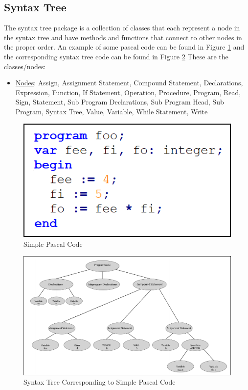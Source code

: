 \documentclass[english]{article}
\begin{document}
\subsection{Syntax Tree}

The syntax tree package is a collection of classes that each represent a node in the syntax tree and have methods and functions that connect to other nodes in the proper order. An example of some pascal code can be found in Figure \ref{Tree Code} and the corresponding syntax tree code can be found in Figure  \ref{Syntax Tree} These are the classes/nodes:

\begin{itemize}
\item
\underline{Nodes}: Assign, Assignment Statement, Compound Statement, Declarations, Expression, Function, If Statement, Operation, Procedure, Program, Read, Sign, Statement, Sub Program Declarations, Sub Program Head, Sub Program, Syntax Tree, Value, Variable, While Statement, Write
\end{itemize}



\begin{figure}
\begin{center}
\includegraphics[width=.8\textwidth]{tree_code.PNG}
\end{center}
\caption{\label{Tree Code}Simple Pascal Code}
\end{figure}

\begin{figure}
\begin{center}
\includegraphics[width=1\textwidth]{syntax_tree.PNG}
\end{center}
\caption{\label{Syntax Tree}Syntax Tree Corresponding to Simple Pascal Code}
\end{figure}
\end{document}
